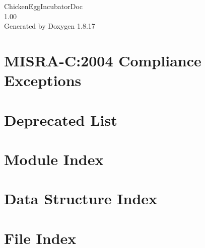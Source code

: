 \let\mypdfximage\pdfximage\def\pdfximage{\immediate\mypdfximage}\documentclass[twoside]{book}
\newcommand{\+}{\discretionary{\mbox{\scriptsize$\hookleftarrow$}}{}{}}
\newcommand{\clearemptydoublepage}{%
  \newpage{\pagestyle{empty}\cleardoublepage}%
}
\begin{document}
\hypersetup{pageanchor=false,
             bookmarksnumbered=true,
             pdfencoding=unicode
            }
\begin{titlepage}
\vspace*{7cm}
\begin{center}%
{\Large Chicken\+Egg\+Incubator\+Doc \\[1ex]\large 1.\+00 }\\
\vspace*{1cm}
{\large Generated by Doxygen 1.8.17}\\
\end{center}
\end{titlepage}
\clearemptydoublepage
{}
\tableofcontents
\clearemptydoublepage
{}
\hypersetup{pageanchor=true}

\chapter{M\+I\+S\+R\+A-\/C\+:2004 Compliance Exceptions}
\label{_c_m_s_i_s__m_i_s_r_a__exceptions}

\chapter{Deprecated List}
\label{deprecated}

\chapter{Module Index}

\chapter{Data Structure Index}

\chapter{File Index}

\end{document}
